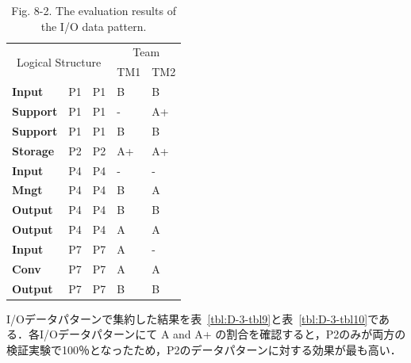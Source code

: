 \documentclass[a4paper,11pt]{jreport}
\begin{document}
\begin{table}[htbp]
  \centering
  \caption{Fig. 8-2. The evaluation results of the I/O data pattern.}
    \begin{tabular}{|l|l|l|l|l|}
    \hline
    \multicolumn{3}{|c|}{\multirow{2}[4]{*}{Logical
Structure}} & \multicolumn{2}{c|}{Team} \bigstrut\\
\cline{4-5}    \multicolumn{3}{|c|}{} & TM1   & TM2 \bigstrut\\
    \hline
    \textbf{Input} & P1    & P1    & B     & B \bigstrut\\
    \hline
    \textbf{Support} & P1    & P1    & -     & A+ \bigstrut\\
    \hline
    \textbf{Support} & P1    & P1    & B     & B \bigstrut\\
    \hline
    \textbf{Storage} & P2    & P2    & A+    & A+ \bigstrut\\
    \hline
    \textbf{Input} & P4    & P4    & -     & - \bigstrut\\
    \hline
    \textbf{Mngt} & P4    & P4    & B     & A \bigstrut\\
    \hline
    \textbf{Output} & P4    & P4    & B     & B \bigstrut\\
    \hline
    \textbf{Output} & P4    & P4    & A     & A \bigstrut\\
    \hline
    \textbf{Input} & P7    & P7    & A     & - \bigstrut\\
    \hline
    \textbf{Conv} & P7    & P7    & A     & A \bigstrut\\
    \hline
    \textbf{Output} & P7    & P7    & B     & B \bigstrut\\
    \hline
    \end{tabular}%
  \label{tbl:D-3-tbl8}%
\end{table}%

I/Oデータパターンで集約した結果を表~\ref{tbl:D-3-tbl9}と表~\ref{tbl:D-3-tbl10}である．各I/Oデータパターンにて A and A+ の割合を確認すると，P2のみが両方の検証実験で100％となったため，P2のデータパターンに対する効果が最も高い．
\end{document}
